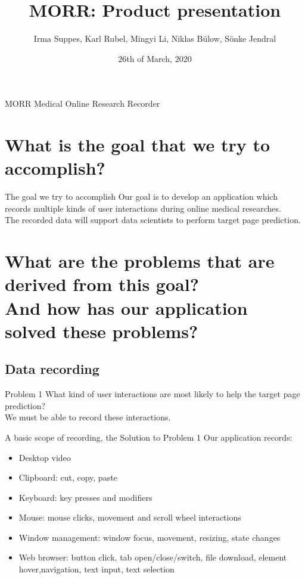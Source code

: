 \documentclass[aspectratio=169]{beamer}
\title{MORR: Product presentation}
\author{Irma Suppes, Karl Rubel, Mingyi Li, Niklas Bülow, Sönke Jendral}
\date{26th of March, 2020}
\institute{KIT / Teco}
\begin{document}
  \maketitle
  
  \begin{frame}{MORR}
      Medical Online Research Recorder
  \end{frame}

  \section{What is the goal that we try to accomplish?}

  \begin{frame}{The goal we try to accomplish}
    Our goal is to develop an application which records multiple kinds of user interactions during online medical researches.\\
    The recorded data will support data scientists to perform target page prediction.
  \end{frame}

  \section{What are the problems that are derived from this goal? \\And how has our application solved these problems?}
  
   \subsection{Data recording}
   
   \begin{frame}{Problem 1}
       What kind of user interactions are most likely to help the target page prediction?\\
       We must be able to record these interactions.
   \end{frame}
   
   \begin{frame}{A basic scope of recording, the Solution to Problem 1}
    Our application records:
        \begin{itemize}
            \item  Desktop video
            \item Clipboard:  cut, copy, paste
            \item Keyboard:  key presses and modifiers
            \item  Mouse:  mouse clicks, movement and scroll wheel interactions
            \item Window management:  window focus, movement, resizing, state changes
            \item Web browser:  button click, tab open/close/switch, file download, element hover,navigation, text input, text selection
        \end{itemize}
   \end{frame}
   
\end{document}
